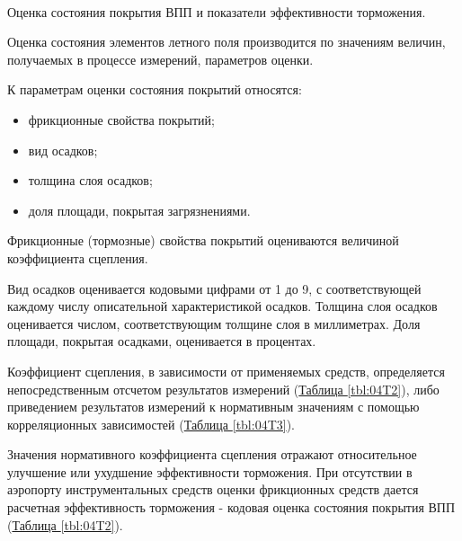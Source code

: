 \paragraph{} Оценка состояния покрытия ВПП и показатели эффективности торможения.

Оценка состояния элементов летного поля производится по значениям величин, получаемых в процессе измерений, параметров оценки.

К параметрам оценки состояния покрытий относятся:
\begin{itemize}
    \item фрикционные свойства покрытий;
    \item вид осадков;
    \item толщина слоя осадков;
    \item доля площади, покрытая загрязнениями.
\end{itemize}


Фрикционные (тормозные) свойства покрытий оцениваются величиной коэффициента сцепления.

Вид осадков оценивается кодовыми цифрами от 1 до 9, с соответствующей каждому числу описательной характеристикой осадков. 
Толщина слоя осадков оценивается числом, соответствующим толщине слоя в миллиметрах. Доля площади, покрытая осадками, оценивается в процентах.

Коэффициент сцепления, в зависимости от применяемых средств, определяется непосредственным отсчетом результатов измерений (\hyperref[tbl:04T2]{Таблица \ref*{tbl:04T2}}), либо приведением результатов измерений к нормативным значениям с помощью корреляционных зависимостей (\hyperref[tbl:04T3]{Таблица \ref*{tbl:04T3}}).

Значения нормативного коэффициента сцепления отражают относительное улучшение или ухудшение эффективности торможения.
При отсутствии в аэропорту инструментальных средств оценки фрикционных средств дается расчетная эффективность торможения - кодовая оценка состояния покрытия ВПП (\hyperref[tbl:04T2]{Таблица \ref*{tbl:04T2}}).

